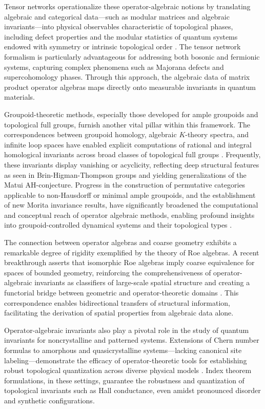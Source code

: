 Tensor networks operationalize these operator-algebraic notions by translating algebraic and categorical data—such as modular matrices and algebraic invariants—into physical observables characteristic of topological phases, including defect properties and the modular statistics of quantum systems endowed with symmetry or intrinsic topological order \cite{ref21}. The tensor network formalism is particularly advantageous for addressing both bosonic and fermionic systems, capturing complex phenomena such as Majorana defects and supercohomology phases. Through this approach, the algebraic data of matrix product operator algebras maps directly onto measurable invariants in quantum materials.

Groupoid-theoretic methods, especially those developed for ample groupoids and topological full groups, furnish another vital pillar within this framework. The correspondences between groupoid homology, algebraic $K$-theory spectra, and infinite loop spaces have enabled explicit computations of rational and integral homological invariants across broad classes of topological full groups \cite{ref22}. Frequently, these invariants display vanishing or acyclicity, reflecting deep structural features as seen in Brin-Higman-Thompson groups and yielding generalizations of the Matui AH-conjecture. Progress in the construction of permutative categories applicable to non-Hausdorff or minimal ample groupoids, and the establishment of new Morita invariance results, have significantly broadened the computational and conceptual reach of operator algebraic methods, enabling profound insights into groupoid-controlled dynamical systems and their topological types \cite{ref22,ref23}.

The connection between operator algebras and coarse geometry exhibits a remarkable degree of rigidity exemplified by the theory of Roe algebras. A recent breakthrough asserts that isomorphic Roe algebras imply coarse equivalence for spaces of bounded geometry, reinforcing the comprehensiveness of operator-algebraic invariants as classifiers of large-scale spatial structure and creating a functorial bridge between geometric and operator-theoretic domains \cite{ref34}. This correspondence enables bidirectional transfers of structural information, facilitating the derivation of spatial properties from algebraic data alone.

Operator-algebraic invariants also play a pivotal role in the study of quantum invariants for noncrystalline and patterned systems. Extensions of Chern number formulas to amorphous and quasicrystalline systems—lacking canonical site labeling—demonstrate the efficacy of operator-theoretic tools for establishing robust topological quantization across diverse physical models \cite{ref25}. Index theorem formulations, in these settings, guarantee the robustness and quantization of topological invariants such as Hall conductance, even amidst pronounced disorder and synthetic configurations.

